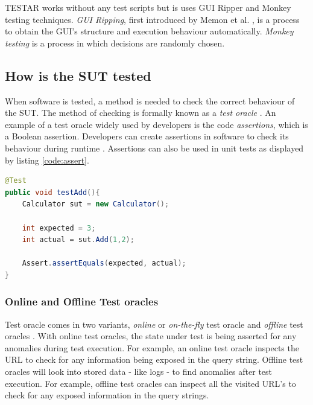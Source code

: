 TESTAR works without any test scripts but is uses GUI Ripper and Monkey testing techniques. \emph{GUI Ripping}, first introduced by Memon et al. \cite{gui-ripping}, is a process to obtain the GUI's structure and execution behaviour automatically. \emph{Monkey testing} is a process in which decisions are randomly chosen. 


\subsection{How is the SUT tested}
When software is tested, a method is needed to check the correct behaviour of the SUT. The method of checking is formally known as a \emph{test oracle} \cite{testOracles}. An example of a test oracle widely used by developers is the code \emph{assertions}, which is a Boolean assertion. Developers can create assertions in software to check its behaviour during runtime \cite{barr2014oracle}. Assertions can also be used in unit tests as displayed by listing \ref{code:assert}. 

\begin{lstlisting}[language=Java, caption=Assertion, label=code:assert]
@Test
public void testAdd(){
    Calculator sut = new Calculator();

    int expected = 3;
    int actual = sut.Add(1,2);

    Assert.assertEquals(expected, actual);
}
\end{lstlisting}

\subsubsection{Online and Offline Test oracles}
Test oracle comes in two variants, \emph{online} or \emph{on-the-fly} test oracle and \emph{offline} test oracles \cite{VosAho2021}. With online test oracles, the state under test is being asserted for any anomalies during test execution. For example,  an online test oracle inspects the URL to check for any information being exposed in the query string. Offline test oracles will look into stored data - like logs - to find anomalies after test execution. For example, offline test oracles can inspect all the visited URL's to check for any exposed information in the query strings.


